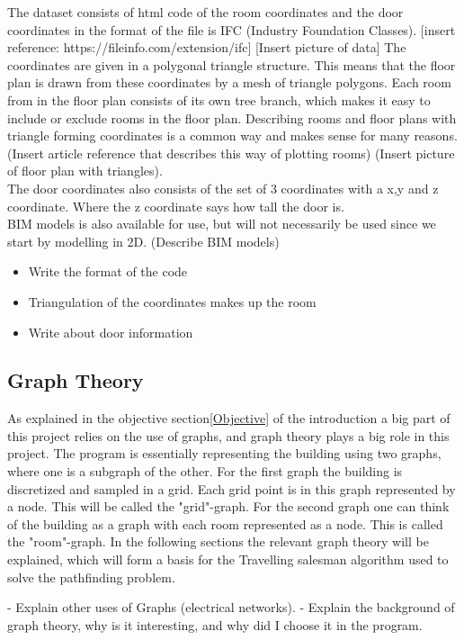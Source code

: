 The dataset consists of html code of the room coordinates and the door coordinates in the format of the file is IFC (Industry Foundation Classes). [insert reference: https://fileinfo.com/extension/ifc]
[Insert picture of data]
The coordinates are given in a polygonal triangle structure. This means that the floor plan is drawn from these coordinates by a mesh of triangle polygons. Each room from in the floor plan consists of its own tree branch, which makes it easy to include or exclude rooms in the floor plan.
Describing rooms and floor plans with triangle forming coordinates is a common way and makes sense for many reasons.
(Insert article reference that describes this way of plotting rooms)
(Insert picture of floor plan with triangles).
\\
The door coordinates also consists of the set of 3 coordinates with a x,y and z coordinate. Where the z coordinate says how tall the door is. 
\\
BIM models is also available for use, but will not necessarily be used since we start by modelling in 2D.
(Describe BIM models)
\begin{itemize}
    \item Write the format of the code
    \item Triangulation of the coordinates makes up the room
    \item Write about door information
\end{itemize}

\subsection{Graph Theory}
As explained in the objective section\ref{Objective} of the introduction a big part of this project relies on the use of graphs, and graph theory plays a big role in this project. 
The program is essentially representing the building using two graphs, where one is a subgraph of the other. 
For the first graph the building is discretized and sampled in a grid. Each grid point is in this graph represented by a node. This will be called the "grid"-graph.
For the second graph one can think of the building as a graph with each room represented as a node. This is called the "room"-graph.
In the following sections the relevant graph theory will be explained, which will form a basis for the Travelling salesman algorithm used to solve the pathfinding problem.

- Explain other uses of Graphs (electrical networks).
- Explain the background of graph theory, why is it interesting, and why did I choose it in the program.

